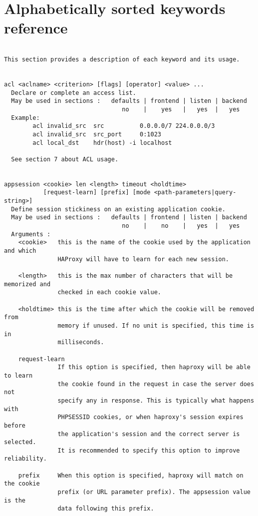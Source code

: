 
\section{Alphabetically sorted keywords reference}\label{keywords reference}

\begin{verbatim}

This section provides a description of each keyword and its usage.


acl <aclname> <criterion> [flags] [operator] <value> ...
  Declare or complete an access list.
  May be used in sections :   defaults | frontend | listen | backend
                                 no    |    yes   |   yes  |   yes
  Example:
        acl invalid_src  src          0.0.0.0/7 224.0.0.0/3
        acl invalid_src  src_port     0:1023
        acl local_dst    hdr(host) -i localhost

  See section 7 about ACL usage.


appsession <cookie> len <length> timeout <holdtime>
           [request-learn] [prefix] [mode <path-parameters|query-string>]
  Define session stickiness on an existing application cookie.
  May be used in sections :   defaults | frontend | listen | backend
                                 no    |    no    |   yes  |   yes
  Arguments :
    <cookie>   this is the name of the cookie used by the application and which
               HAProxy will have to learn for each new session.

    <length>   this is the max number of characters that will be memorized and
               checked in each cookie value.

    <holdtime> this is the time after which the cookie will be removed from
               memory if unused. If no unit is specified, this time is in
               milliseconds.

    request-learn
               If this option is specified, then haproxy will be able to learn
               the cookie found in the request in case the server does not
               specify any in response. This is typically what happens with
               PHPSESSID cookies, or when haproxy's session expires before
               the application's session and the correct server is selected.
               It is recommended to specify this option to improve reliability.

    prefix     When this option is specified, haproxy will match on the cookie
               prefix (or URL parameter prefix). The appsession value is the
               data following this prefix.


\end{verbatim}
